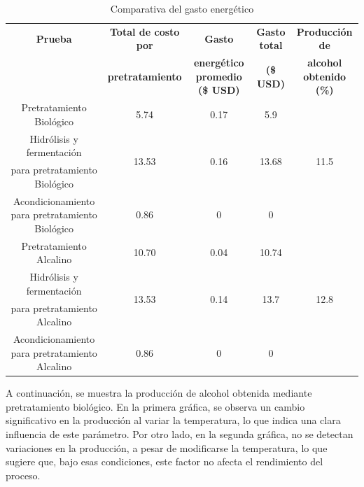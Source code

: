 \documentclass[12pt]{article}
\begin{document}
	
	\begin{table}[H]
		\centering
		\caption{Comparativa del gasto energético}
		\label{energi_2}
		\resizebox{16cm}{!} {
			\begin{tabular}{|c|c|c|c|c|}
				\hline
			\textbf{Prueba} & \textbf{Total de costo por} &\textbf{ Gasto}  & \textbf{Gasto total} & \textbf{Producción de} \\ 
				~ &  \textbf{pretratamiento} & \textbf{ energético promedio (\$ USD)} & \textbf{  (\$ USD)} &\textbf{  alcohol obtenido (\%)  }\\ \hline
				
				Pretratamiento Biológico & 5.74 & 0.17 & 5.9&   \\ \cline{1-4}
				Hidrólisis y fermentación  & \multirow{2}{*}{13.53}& \multirow{2}{*}{0.16} & \multirow{2}{*}{13.68}  & \multirow{2}{*}{11.5}  \\ 
				para pretratamiento Biológico & ~ & ~ & ~ &   \\ \cline{1-4}
			    Acondicionamiento para pretratamiento Biológico & 0.86 & 0& 0&   \\ \hline
				Pretratamiento Alcalino & 10.70 & 0.04 & 10.74&   \\ \cline{1-4}
				Hidrólisis y fermentación  &  \multirow{2}{*}{13.53} & \multirow{2}{*}{0.14} & \multirow{2}{*}{13.7}& \multirow{2}{*}{12.8}  \\  
				para pretratamiento Alcalino & ~ & ~ & ~ &   \\ \cline{1-4}
				Acondicionamiento para pretratamiento Alcalino &0.86 & 0 & 0&   \\ \hline
		\end{tabular}	}
	\end{table}
	
	
	

	
			
		A continuación, se muestra la producción de alcohol obtenida mediante pretratamiento biológico. En la primera gráfica, se observa un cambio significativo en la producción al variar la temperatura, lo que indica una clara influencia de este parámetro. Por otro lado, en la segunda gráfica, no se detectan variaciones en la producción, a pesar de modificarse la temperatura, lo que sugiere que, bajo esas condiciones, este factor no afecta el rendimiento del proceso.
			
\end{document}
